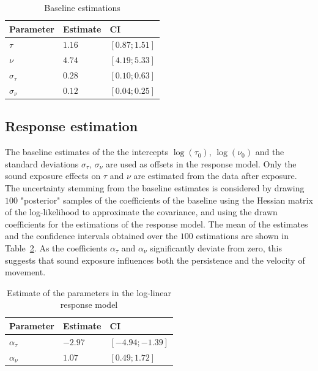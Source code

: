 \documentclass[aoas]{imsart}
\theoremstyle{definition}
\theoremstyle{remark}
\theoremstyle{remark}
\newcommand {\1}{\mathbb{1}}
\begin{document}
\begin{table}[ht!]
	\centering
	\begin{tabular}{lll}
		\hline
		Parameter & Estimate & CI \\ 
		\hline
		$\tau$ & $1.16$ & $[0.87; 1.51]$ \\ 
		$\nu$ & $4.74$ & $[4.19; 5.33]$ \\ 
		$\sigma_{\tau}$ & $0.28$ & $[0.10; 0.63]$ \\ 
		$\sigma_{\nu}$ & $0.12$ & $[0.04; 0.25]$ \\ 
		\hline
	\end{tabular}
	\caption{Baseline estimations}
\label{table: baseline estimations}
\end{table}


\subsection{Response estimation}

The baseline estimates of the the intercepts $\log(\tau_0)$, $\log(\nu_0)$ and the standard deviations $\sigma_{\tau}$, $\sigma_{\nu}$ are used as offsets in the response model. Only the sound exposure effects on $\tau$ and $\nu$ are estimated from the data after exposure. The uncertainty stemming from the baseline estimates is considered by drawing $100$ "posterior" samples of the coefficients of the baseline using the Hessian matrix of the log-likelihood to approximate the covariance, and using the drawn coefficients for the estimations of the response model. The mean of the estimates and the confidence intervals obtained over the $100$ estimations are shown in Table~\ref{table: response estimations}. As the coefficients $\alpha_\tau$ and $\alpha_\nu$ significantly deviate from zero, this suggests that sound exposure influences both the persistence and the velocity of movement.\\

\begin{table}[ht!]
	\centering
	\begin{tabular}{lll}
		\hline
		Parameter & Estimate & CI \\ 
		\hline
		$\alpha_{\tau}$ & $-2.97$ & $[-4.94; -1.39]$ \\ 
		$\alpha_{\nu}$ & $1.07$ & $[0.49; 1.72]$ \\ 
		\hline
	\end{tabular}
	\caption{Estimate of the parameters in the log-linear response model}
\label{table: response estimations}
\end{table}
\end{document}
